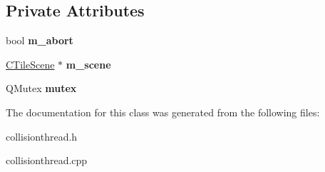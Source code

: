\subsection*{Private Attributes}
\begin{DoxyCompactItemize}
\item 
\mbox{\label{class_collision_thread_adcc2b3ae707e6fd1ab884522cd69e8bf}} 
bool {\bfseries m\+\_\+abort}
\item 
\mbox{\label{class_collision_thread_a63f8735e54b0f4a2dfaf8be1c75e4a9e}} 
\hyperlink{class_c_tile_scene}{C\+Tile\+Scene} $\ast$ {\bfseries m\+\_\+scene}
\item 
\mbox{\label{class_collision_thread_ac00c1e2465a80a6fb72e4f79dcff7f7d}} 
Q\+Mutex {\bfseries mutex}
\end{DoxyCompactItemize}


The documentation for this class was generated from the following files\+:\begin{DoxyCompactItemize}
\item 
collisionthread.\+h\item 
collisionthread.\+cpp\end{DoxyCompactItemize}
